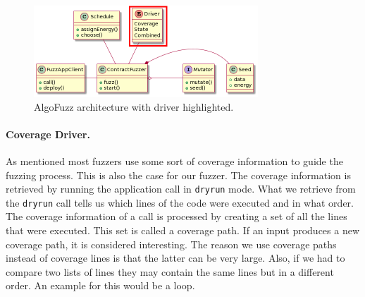 \begin{figure}[htbp]
    \centering
    \includegraphics[width=0.75\textwidth]{figures/arc-driver.png}
    \caption{AlgoFuzz architecture with driver highlighted.}\label{fig:architecture-driver}
\end{figure}

\paragraph{Coverage Driver.}
As mentioned most fuzzers use some sort of coverage information to guide the fuzzing process.
This is also the case for our fuzzer.
The coverage information is retrieved by running the application call in \texttt{dryrun} mode.
What we retrieve from the \texttt{dryrun} call tells us which lines of the code were executed and in what order.
The coverage information of a call is processed by creating a set of all the lines that were executed.
This set is called a coverage path.
If an input produces a new coverage path, it is considered interesting.
The reason we use coverage paths instead of coverage lines is that the latter can be very large.
Also, if we had to compare two lists of lines they may contain the same lines but in a different order.
An example for this would be a loop.

